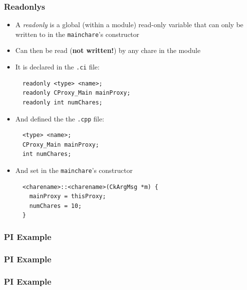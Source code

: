 \begin{frame}[fragile]
  \frametitle{Readonlys}
  \begin{itemize}
  \item A \textit{readonly} is a global (within a module) read-only variable
    that can only be written to in the \texttt{mainchare}'s constructor
  \item Can then be read (\textbf{not written!}) by any chare in the module
  \item It is declared in the \texttt{.ci} file:
\begin{lstlisting}
  readonly <type> <name>;
  readonly CProxy_Main mainProxy;
  readonly int numChares;
\end{lstlisting}
  \item And defined the the \texttt{.cpp} file:
\begin{lstlisting}
  <type> <name>;
  CProxy_Main mainProxy;
  int numChares;
\end{lstlisting}
  \item And set in the \texttt{mainchare}'s constructor
\begin{lstlisting}
  <charename>::<charename>(CkArgMsg *m) {
    mainProxy = thisProxy;
    numChares = 10;
  }
\end{lstlisting}


  \end{itemize}
\end{frame}

\begin{frame}[fragile]
  \frametitle{PI Example}
    
\end{frame}

\begin{frame}[fragile]
  \frametitle{PI Example}
  
\end{frame}

\begin{frame}[fragile]
  \frametitle{PI Example}
  
\end{frame}

